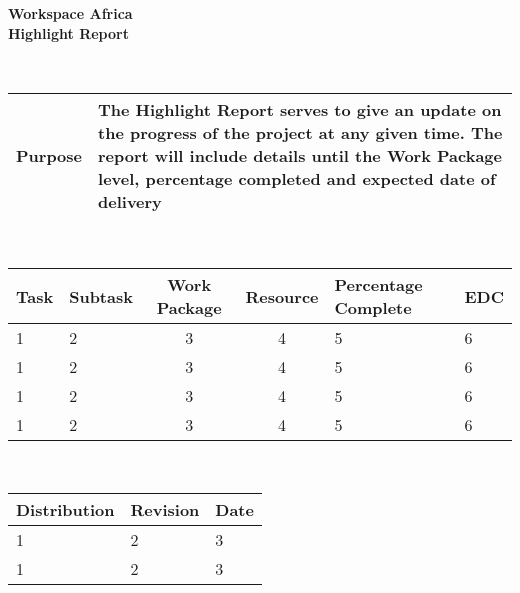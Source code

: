 \documentclass[a4paper,12pt]{article}
\date{07/09/2016}
\author{Preshane Pillay}
\begin{document}
   \centering
      \begin{Huge}
	{\bfseries Workspace Africa} \\
	{\bfseries Highlight Report} \\ 
      \end{Huge}
  
  \\[4cm]
      
      \begin{tabular}{|p{3cm}|p{10cm}|}
	\hline
	{\bfseries Purpose} & {The Highlight Report serves to give an update on the progress of the project at any given time. The report will include details until the Work Package level, percentage completed and expected date of delivery}\\
	\hline
      \end{tabular}
      
  \\[4cm]
  
    \centering 
    \caption{Highlight Report}
      \begin{small}
	\begin{tabular}{||l|l|c|c|l|l||}
	  \hline
	 {\bfseries Task} & {\bfseries Subtask} &{\bfseries Work Package} & {\bfseries Resource} & {\bfseries Percentage Complete} & {\bfseries EDC} \\
	  \hline
       
	      1 & 2 & 3 & 4 & 5 & 6 \\
	  \hline
	      1 & 2 & 3 & 4 & 5 & 6 \\
	  \hline
	      1 & 2 & 3 & 4 & 5 & 6 \\
	  \hline
	      1 & 2 & 3 & 4 & 5 & 6 \\
	   \hline
	\end{tabular}
      \end{small}
      
      \\[4cm]

      \begin{tabular}{|p{5cm}|p{5cm}|p{2cm}|}
	\hline
	{\bfseries Distribution} & {\bfseries Revision} & {\bfseries Date} \\
	\hline
 
	     1 & 2 & 3 \\
	\hline
	     1 & 2 & 3 \\
	\hline
      \end{tabular}
\end{document}
